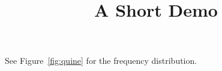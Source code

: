 \documentclass[article]{jss}
\title{A Short Demo}
\begin{document}
See Figure~\ref{fig:quine} for the frequency distribution.
\end{document}
